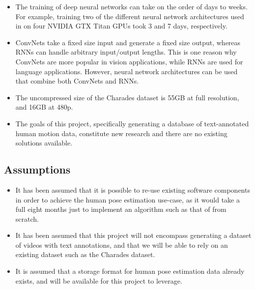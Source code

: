\documentclass{scrreprt}
\begin{document}
\begin{itemize}
        \item The training of deep neural networks can take on the order of
                days to weeks. For example, training two of the different
                neural network architectures used in
                \cite{DBLP:journals/corr/PfisterCZ15} on four NVIDIA GTX Titan
                GPUs took 3 and 7 days, respectively.
        \item ConvNets take a fixed size input and generate a fixed size
                output, whereas RNNs can handle arbitrary input/output lengths.
                This is one reason why ConvNets are more popular in vision
                applications, while RNNs are used for language applications.
                However, neural network architectures can be used that combine
                both ConvNets and RNNs.
        \item The uncompressed size of the Charades dataset is 55GB at full
                resolution, and 16GB at 480p.
        \item The goals of this project, specifically generating a database of
                text-annotated human motion data, constitute new research and
                there are no existing solutions available.
\end{itemize}

\subsection{Assumptions}

\begin{itemize}
        \item It has been assumed that it is possible to re-use existing
                software components in order to achieve the human pose
                estimation use-case, as it would take a full eight months just
                to implement an algorithm such as that of
                \cite{DBLP:journals/corr/PfisterCZ15} from scratch.
        \item It has been assumed that this project will not encompass
                generating a dataset of videos with text annotations, and that
                we will be able to rely on an existing dataset such as the
                Charades dataset.
        \item It is assumed that a storage format for human pose estimation
                data already exists, and will be available for this project to
                leverage.
\end{itemize}
\end{document}
